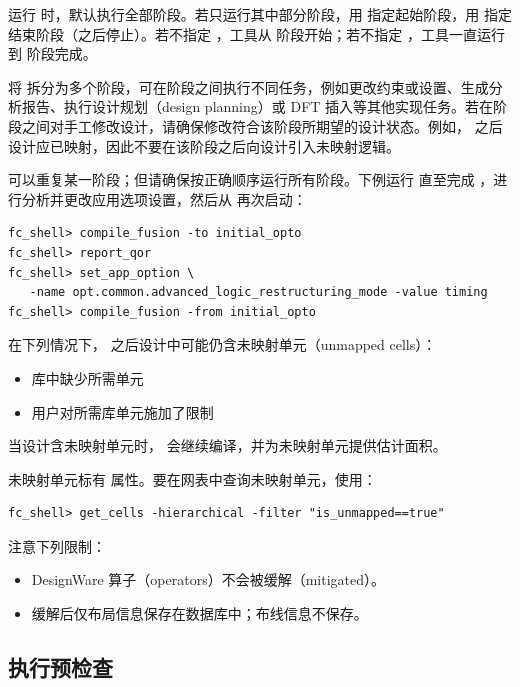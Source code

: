 运行  时，默认执行全部阶段。若只运行其中部分阶段，用  指定起始阶段，用  指定结束阶段（之后停止）。若不指定 ，工具从  阶段开始；若不指定 ，工具一直运行到  阶段完成。

将  拆分为多个阶段，可在阶段之间执行不同任务，例如更改约束或设置、生成分析报告、执行设计规划（design planning）或 DFT 插入等其他实现任务。若在阶段之间对手工修改设计，请确保修改符合该阶段所期望的设计状态。例如， 之后设计应已映射，因此不要在该阶段之后向设计引入未映射逻辑。

可以重复某一阶段；但请确保按正确顺序运行所有阶段。下例运行  直至完成 ，进行分析并更改应用选项设置，然后从  再次启动：
\begin{lstlisting}
fc_shell> compile_fusion -to initial_opto
fc_shell> report_qor
fc_shell> set_app_option \
   -name opt.common.advanced_logic_restructuring_mode -value timing
fc_shell> compile_fusion -from initial_opto
\end{lstlisting}

在下列情况下， 之后设计中可能仍含未映射单元（unmapped cells）：
\begin{itemize}
  \item 库中缺少所需单元
  \item 用户对所需库单元施加了限制
\end{itemize}

当设计含未映射单元时， 会继续编译，并为未映射单元提供估计面积。

未映射单元标有  属性。要在网表中查询未映射单元，使用：
\begin{lstlisting}
fc_shell> get_cells -hierarchical -filter "is_unmapped==true"
\end{lstlisting}

注意下列限制：
\begin{itemize}
  \item DesignWare 算子（operators）不会被缓解（mitigated）。
  \item 缓解后仅布局信息保存在数据库中；布线信息不保存。
\end{itemize}

\subsection{执行预检查}
